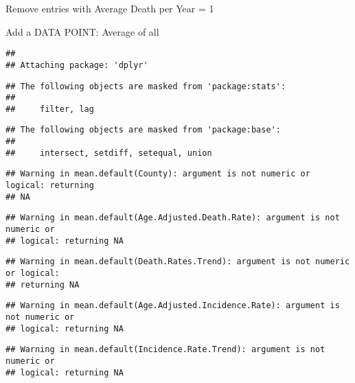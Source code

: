\documentclass[]{article}
\newenvironment{Shaded}{\begin{snugshade}}{\end{snugshade}}
\newcommand{\NormalTok}[1]{#1}
\newcommand{\OperatorTok}[1]{\textcolor[rgb]{0.81,0.36,0.00}{\textbf{#1}}}
\newcommand{\StringTok}[1]{\textcolor[rgb]{0.31,0.60,0.02}{#1}}
\begin{document}
Remove entries with Average Death per Year = 1

\begin{Shaded}
\end{Shaded}

Add a DATA POINT: Average of all

\begin{verbatim}
## 
## Attaching package: 'dplyr'
\end{verbatim}

\begin{verbatim}
## The following objects are masked from 'package:stats':
## 
##     filter, lag
\end{verbatim}

\begin{verbatim}
## The following objects are masked from 'package:base':
## 
##     intersect, setdiff, setequal, union
\end{verbatim}

\begin{verbatim}
## Warning in mean.default(County): argument is not numeric or logical: returning
## NA
\end{verbatim}

\begin{verbatim}
## Warning in mean.default(Age.Adjusted.Death.Rate): argument is not numeric or
## logical: returning NA
\end{verbatim}

\begin{verbatim}
## Warning in mean.default(Death.Rates.Trend): argument is not numeric or logical:
## returning NA
\end{verbatim}

\begin{verbatim}
## Warning in mean.default(Age.Adjusted.Incidence.Rate): argument is not numeric or
## logical: returning NA
\end{verbatim}

\begin{verbatim}
## Warning in mean.default(Incidence.Rate.Trend): argument is not numeric or
## logical: returning NA
\end{verbatim}
\end{document}
